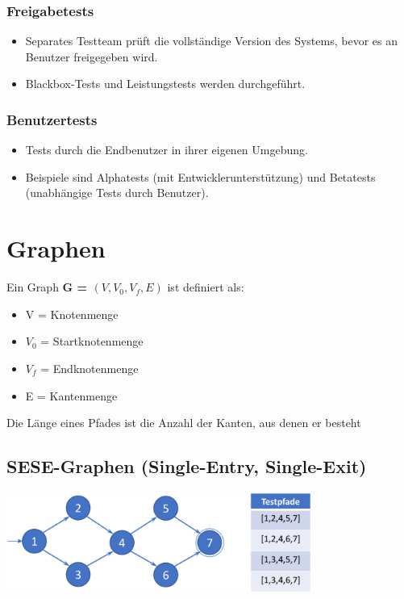 \documentclass[11pt, a4paper]{article}
\begin{document}
\subsubsection{Freigabetests}
\begin{itemize}
    \item Separates Testteam prüft die vollständige Version des Systems, bevor es an Benutzer freigegeben wird.
    \item Blackbox-Tests und Leistungstests werden durchgeführt.
\end{itemize}

\subsubsection{Benutzertests}
\begin{itemize}
    \item Tests durch die Endbenutzer in ihrer eigenen Umgebung.
    \item Beispiele sind Alphatests (mit Entwicklerunterstützung) und Betatests (unabhängige Tests durch Benutzer).
\end{itemize}

\newpage



\section{Graphen}

Ein Graph \textbf{G = $ (V, V_0, V_f, E) $} ist definiert als:

\begin{itemize}
    \item V = Knotenmenge
    \item $V_0$ = Startknotenmenge
    \item $V_f$ = Endknotenmenge
    \item E = Kantenmenge
\end{itemize}

Die Länge eines Pfades ist die Anzahl der Kanten, aus denen er besteht

\subsection*{SESE-Graphen (Single-Entry, Single-Exit)}

\centering \includegraphics[width=0.75\textwidth]{Graphen-00.png} \raggedright
\end{document}
